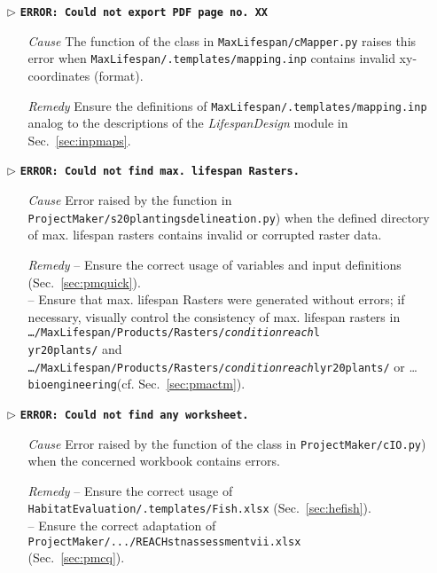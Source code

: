\begin{itemize}
	\item[$\triangleright$]\textbf{\texttt{ERROR: Could not export PDF page no. XX}}
	\begin{itemize}
		\item[\textit{Cause}\hspace{0.27cm}] The  function of the  class in \texttt{MaxLifespan/cMapper.py} raises this error when \texttt{MaxLifespan/.templates/mapping.inp} contains invalid xy-coordinates (format).
		\item[\textit{Remedy}] Ensure the definitions of \texttt{MaxLifespan/.templates/mapping.inp} analog to the descriptions of the \textit{LifespanDesign} module in Sec.~\ref{sec:inpmaps}.\\
	\end{itemize}
	
	\item[$\triangleright$]\textbf{\texttt{ERROR: Could not find max. lifespan Rasters.}}
	\begin{itemize}
		\item[\textit{Cause}\hspace{0.27cm}] Error raised by the  function in \texttt{ProjectMaker/s20{\myUnderscore}plantings{\myUnderscore}delineation.py}) when the defined directory of max. lifespan rasters contains invalid or corrupted raster data.
		\item[\textit{Remedy}] -- Ensure the correct usage of variables and input definitions (Sec.~\ref{sec:pmquick}).\\
		-- Ensure that max. lifespan Rasters were generated without errors; if necessary, visually control the consistency of max. lifespan rasters in \texttt{\ldots{}/MaxLifespan/Products/Rasters/\emph{condition}{\myUnderscore}\emph{reach}{\myUnderscore}l\\yr20{\myUnderscore}plants/} and \texttt{\ldots{}/MaxLifespan/Products/}\texttt{Rasters/\emph{condition}{\myUnderscore}\emph{reach}{\myUnderscore}lyr20{\myUnderscore}plants/} or \ldots{}\texttt{bioengineering}(cf. Sec.~\ref{sec:pmactm}).\\
	\end{itemize}
	
	\item[$\triangleright$]\textbf{\texttt{ERROR: Could not find any worksheet.}}
	\begin{itemize}
		\item[\textit{Cause}\hspace{0.27cm}] Error raised by the  function of the  class in \texttt{ProjectMaker/cIO.py}) when the concerned workbook contains errors.
		\item[\textit{Remedy}] -- Ensure the correct usage of \texttt{HabitatEvaluation/.templates/Fish.xlsx} (Sec.~\ref{sec:hefish}).\\
		-- Ensure the correct adaptation of \texttt{ProjectMaker/.../REACH{\myUnderscore}stn{\myUnderscore}assessment{\myUnderscore}vii.xlsx}\\    (Sec.~\ref{sec:pmcq}).\\
	\end{itemize}
	

\end{itemize}
